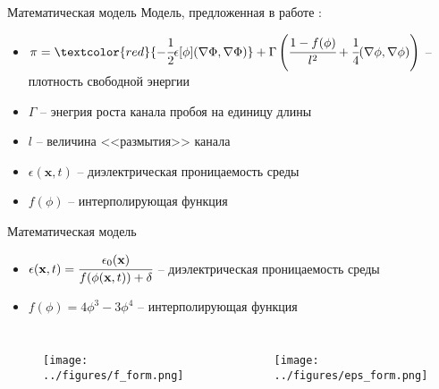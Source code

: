 \documentclass[aspectratio=169]{beamer}
\begin{document}
\begin{frame}{Математическая модель}
Модель, предложенная в работе \cite{pitike_dielectric_breakdown}:
\begin{itemize}
	\item $\pi = \textcolor{red}{-\cfrac{1}{2} \epsilon[\phi] (\nabla \Phi, \nabla \Phi)} +
	\Gamma \left( \cfrac{1 - f(\phi)}{l^2} + \cfrac{1}{4} (\nabla \phi, \nabla \phi) \right)$
	-- плотность свободной энергии
	\item $\Gamma$ -- энегрия роста канала пробоя на единицу длины
	\item $l$ -- величина <<размытия>> канала
	\item $\epsilon(\textbf{x}, t)$ -- диэлектрическая проницаемость среды
	\item $f(\phi)$ -- интерполирующая функция
\end{itemize}
\end{frame}


\begin{frame}{Математическая модель}
\vspace{-0.2cm}
\begin{itemize}
	\item $\epsilon(\textbf{x}, t) = \cfrac{\epsilon_0(\textbf{x})}{f(\phi(\textbf{x}, t)) +
	\delta}$ -- диэлектрическая проницаемость среды
	\item $f(\phi) = 4 \phi^3 - 3 \phi^4$ -- интерполирующая функция
\end{itemize}
\begin{columns}
\begin{figure}
	\hspace*{1.4cm}
	\texttt{[image: ../figures/f\_form.png]}
\end{figure}
\begin{figure}
	\hspace*{-2cm}
	\texttt{[image: ../figures/eps\_form.png]}
\end{figure}
\end{columns}
\end{frame}
\end{document}
